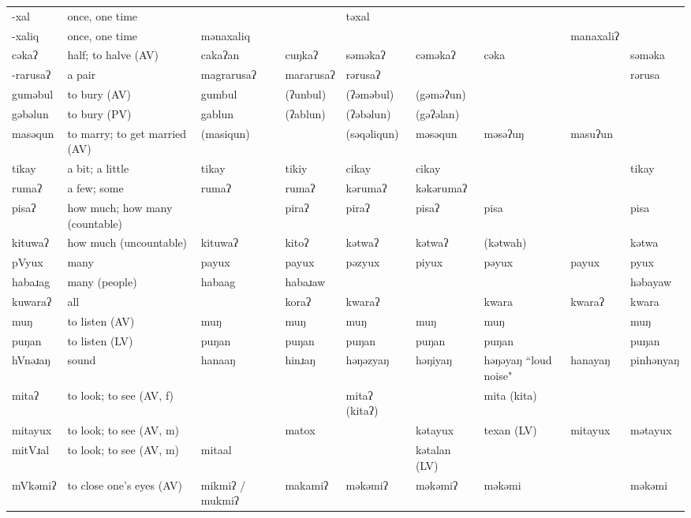 \begin{landscape}
\begin{longtable}{*{9}{p{}}}
\text{*}-xal & once, one time &  &  & təxal &  &  &  & \\
\text{*}-xaliq & once, one time & mənaxaliq &  &  &  &  & manaxaliʔ & \\
\text{*}cəkaʔ & half; to halve (AV) & cakaʔan & cuŋkaʔ & səməkaʔ & cəməkaʔ & cəka &  & səməka\\
\text{*}-rarusaʔ & a pair & magrarusaʔ & mararusaʔ & rərusaʔ &  &  &  & rərusa\\
\text{*}guməbul & to bury (AV) & gumbul & (ʔunbul) & (ʔəməbul) & (gəməʔun) &  &  & \\
\text{*}gəbəlun & to bury (PV) & gablun & (ʔablun) & (ʔəbəlun) & (gəʔəlan) &  &  & \\
\text{*}masəqun & to marry; to get married (AV) & (masiqun) &  & (səqəliqun) & məsəqun & məsəʔuŋ & masuʔun & \\
\text{*}tikay & a bit; a little & tikay & tikiy & cikay & cikay &  &  & tikay\\
\text{*}rumaʔ & a few; some & rumaʔ & rumaʔ & kərumaʔ & kəkərumaʔ &  &  & \\
\text{*}pisaʔ & how much; how many (countable) &  & piraʔ & piraʔ & pisaʔ & pisa &  & pisa\\
\text{*}kituwaʔ & how much (uncountable) & kituwaʔ & kitoʔ & kətwaʔ & kətwaʔ & (kətwah) &  & kətwa\\
\text{*}pVyux & many & payux & payux & pəzyux & piyux & pəyux & payux & pyux\\
\text{*}habaɹag & many (people) & habaag & habaɹaw &  &  &  &  & həbayaw\\
\text{*}kuwaraʔ & all &  & koraʔ & kwaraʔ &  & kwara & kwaraʔ & kwara\\
\text{*}muŋ & to listen (AV) & muŋ & muŋ & muŋ & muŋ & muŋ &  & muŋ\\
\text{*}puŋan & to listen (LV) & puŋan & puŋan & puŋan & puŋan & puŋan &  & puŋan\\
\text{*}hVnəɹaŋ & sound & hanaaŋ & hinɹaŋ & həŋəzyaŋ & həŋiyaŋ & həŋəyaŋ ``loud noise" & hanayaŋ & pinhənyaŋ\\
\text{*}mitaʔ & to look; to see (AV, f) &  &  & mitaʔ (kitaʔ) &  & mita (kita) &  & \\
\text{*}mitayux & to look; to see (AV, m) &  & matox &  & kətayux & texan (LV) & mitayux & mətayux\\
\text{*}mitVɹal & to look; to see (AV, m) & mitaal &  &  & kətalan (LV) &  &  & \\
\text{*}mVkəmiʔ & to close one's eyes (AV) & mikmiʔ / mukmiʔ & makamiʔ & məkəmiʔ & məkəmiʔ & məkəmi &  & məkəmi\\

\end{longtable}
\end{landscape}
